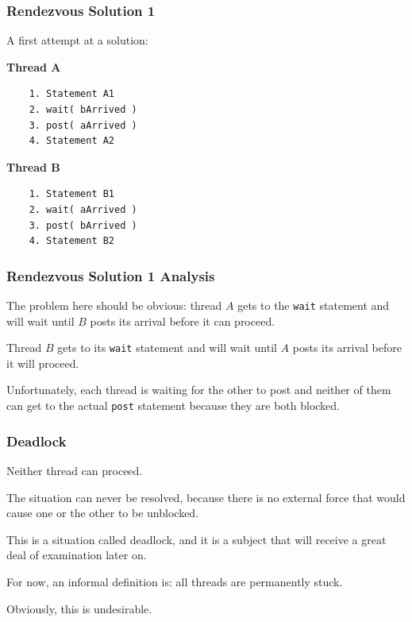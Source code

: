 \begin{frame}[fragile]
\frametitle{Rendezvous Solution 1}

A first attempt at a solution: 

\begin{multicols}{2}
\textbf{Thread A}
  \begin{verbatim}
	1. Statement A1
	2. wait( bArrived )
	3. post( aArrived )
	4. Statement A2
  \end{verbatim}
\columnbreak
\textbf{Thread B}
  \begin{verbatim}
	1. Statement B1
	2. wait( aArrived )
	3. post( bArrived )
	4. Statement B2
  \end{verbatim}
\end{multicols}
\vspace{-2em}


\end{frame}

\begin{frame}
\frametitle{Rendezvous Solution 1 Analysis}

The problem here should be obvious: thread $A$ gets to the \texttt{wait} statement and will wait until $B$ posts its arrival before it can proceed. 

Thread $B$ gets to its \texttt{wait} statement and will wait until $A$ posts its arrival before it will proceed. 

Unfortunately, each thread is waiting for the other to post and neither of them can get to the actual \texttt{post} statement because they are both blocked. 


\end{frame}

\begin{frame}
\frametitle{Deadlock}

Neither thread can proceed. 

The situation can never be resolved, because there is no external force that would cause one or the other to be unblocked. 

This is a situation called \alert{deadlock}, and it is a subject that will receive a great deal of examination later on. 

For now, an informal definition is: all threads are permanently stuck. 

Obviously, this is undesirable.

\end{frame}

